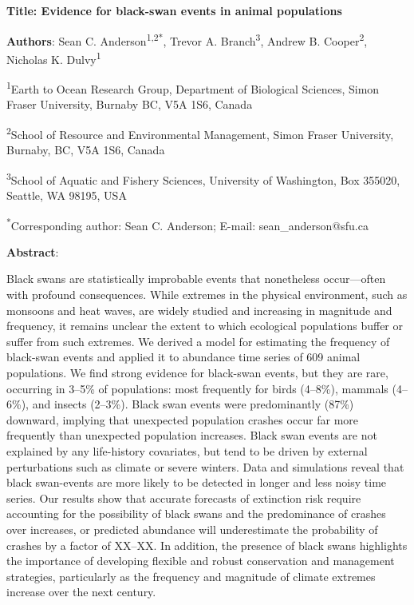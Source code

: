 \textbf{Title: Evidence for black-swan events in animal populations}

\textbf{Authors}: Sean C. Anderson\textsuperscript{1,2*}, Trevor A. Branch\textsuperscript{3}, Andrew B. Cooper\textsuperscript{2}, Nicholas K. Dulvy\textsuperscript{1}

\textsuperscript{1}Earth to Ocean Research Group, Department of Biological Sciences, Simon Fraser University, Burnaby BC, V5A 1S6, Canada

\textsuperscript{2}School of Resource and Environmental Management, Simon Fraser University, Burnaby, BC, V5A 1S6, Canada

\textsuperscript{3}School of Aquatic and Fishery Sciences, University of Washington, Box 355020, Seattle, WA 98195, USA

\textsuperscript{*}Corresponding author: Sean C. Anderson; E-mail: sean\_anderson@sfu.ca

\textbf{Abstract}:

Black swans are statistically improbable events that nonetheless occur---often with profound consequences\cite{taleb2007, sornette2009}. While extremes in the physical environment, such as monsoons and heat waves, are widely studied and increasing in magnitude and frequency\cite{meehl2004, katz2005, ipcc2012}, it remains unclear the extent to which ecological populations buffer or suffer from such extremes. We derived a model for estimating the frequency of black-swan events and applied it to abundance time series of 609 animal populations. We find strong evidence for black-swan events, but they are rare, occurring in 3--5\% of populations: most frequently for birds (4--8\%), mammals (4--6\%), and insects (2--3\%). Black swan events were predominantly (87\%) downward, implying that unexpected population crashes occur far more frequently than unexpected population increases. Black swan events are not explained by any life-history covariates, but tend to be driven by external perturbations such as climate or severe winters. Data and simulations reveal that black swan-events are more likely to be detected in longer and less noisy time series. Our results show that accurate forecasts of extinction risk require accounting for the possibility of black swans and the predominance of crashes over increases, or predicted abundance will underestimate the probability of crashes by a factor of XX--XX. In addition, the presence of black swans highlights the importance of developing flexible and robust conservation and management strategies, particularly as the frequency and magnitude of climate extremes increase over the next century.

